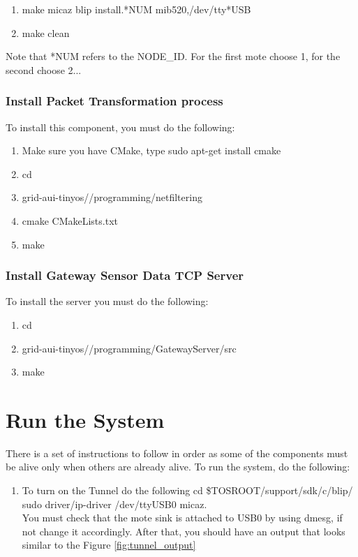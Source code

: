\documentclass[12pt,a4paper,final]{report}
\begin{document}
\begin{appendices}
\begin{enumerate}
\item  make micaz blip install.*NUM mib520,/dev/tty*USB
\item make clean
\end{enumerate}
Note that *NUM refers to the NODE\_ID. For the first mote choose 1, for the second choose 2...

\subsection{Install Packet Transformation process}
To install this component, you must do the following:
\begin{enumerate}
\item Make sure you have CMake, type sudo apt-get install cmake
\item cd
\item grid-aui-tinyos//programming/netfiltering
\item cmake CMakeLists.txt
\item make
\end{enumerate}

\subsection{Install Gateway Sensor Data TCP Server}
To install the server you must do the following:
\begin{enumerate}
\item cd
\item grid-aui-tinyos//programming/GatewayServer/src
\item make
\end{enumerate}

\chapter{Run the System}
There is a set of instructions to follow in order as some of the components must be alive only when others are already alive. To run the system, do the following:
\begin{enumerate}
\item To turn on the Tunnel do the following
\subitem cd \$TOSROOT/support/sdk/c/blip/ 
\subitem sudo driver/ip-driver /dev/ttyUSB0 micaz. \\
 You must check that the mote sink is attached to USB0 by using dmesg, if not change it accordingly. After that, you should have an output that looks similar to the Figure \ref{fig:tunnel_output}


\end{enumerate}
\end{appendices}
\end{document}
